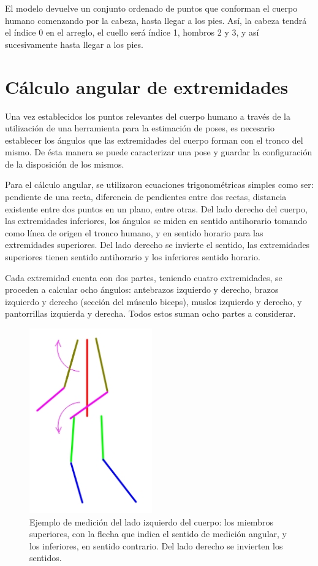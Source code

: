 \documentclass[a4paper,12pt,oneside,spanish]{book}
\begin{document}
El modelo devuelve un conjunto ordenado de puntos que conforman el cuerpo humano comenzando por la cabeza, hasta llegar a los pies. Así, la cabeza tendrá el índice 0 en el arreglo, el cuello será índice 1, hombros 2 y 3, y así sucesivamente hasta llegar a los pies.\par

\section{Cálculo angular de extremidades}\label{calculoangular}

Una vez establecidos los puntos relevantes del cuerpo humano a través de la utilización de una herramienta para la estimación de poses, es necesario establecer los ángulos que las extremidades del cuerpo forman con el tronco del mismo. De ésta manera se puede caracterizar una pose y guardar la configuración de la disposición de los mismos.\par 

Para el cálculo angular, se utilizaron ecuaciones trigonométricas simples como ser: pendiente de una recta, diferencia de pendientes entre dos rectas, distancia existente entre dos puntos en un plano, entre otras. Del lado derecho del cuerpo, las extremidades inferiores, los ángulos se miden en sentido antihorario tomando como línea de origen el tronco humano, y en sentido horario para las extremidades superiores. Del lado derecho se invierte el sentido, las extremidades superiores tienen sentido antihorario y los inferiores sentido horario.\par

Cada extremidad cuenta con dos partes, teniendo cuatro extremidades, se proceden a calcular ocho ángulos: antebrazos izquierdo y derecho, brazos izquierdo y derecho (sección del músculo biceps), muslos izquierdo y derecho, y pantorrillas izquierda y derecha. Todos estos suman ocho partes a considerar.\par

\begin{figure}[h!]
	\includegraphics[width=150pt]{Imagenes/pose6.jpg}
	\centering	
	\caption{Ejemplo de medición del lado izquierdo del cuerpo: los miembros superiores, con la flecha que indica el sentido de medición angular, y los inferiores, en sentido contrario. Del lado derecho se invierten los sentidos.}
	\label{fig:pose5}
\end{figure}
\end{document}
